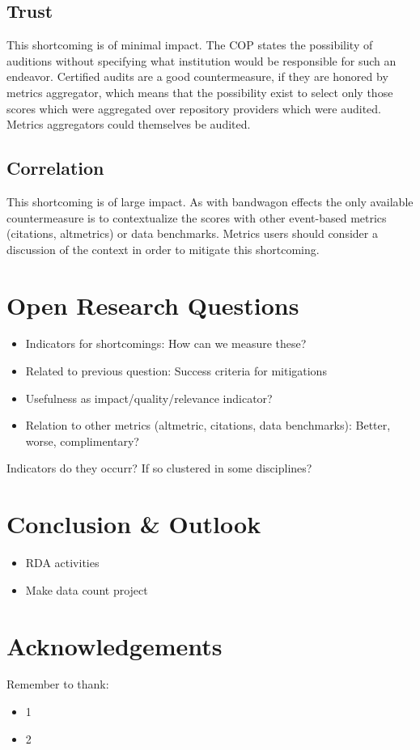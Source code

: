 \documentclass[conference, a4paper]{IEEEtran}\usepackage[]{graphicx}\usepackage[]{color}
\begin{document}
\subsection{Trust}
This shortcoming is of minimal impact.
The COP states the possibility of auditions without specifying what institution would be
responsible for such an endeavor.
Certified audits are a good countermeasure, if they are honored by metrics aggregator,
which means that the possibility exist to select only those scores which were aggregated
over repository providers which were audited.
Metrics aggregators could themselves be audited.

\subsection{Correlation}
This shortcoming is of large impact.
As with bandwagon effects the only available countermeasure is to contextualize the scores
with other event-based metrics (citations, altmetrics) or data benchmarks.
Metrics users should consider a discussion of the context in order to mitigate this shortcoming.

\section{Open Research Questions}\label{sec:questions}


\begin{itemize}
        \item Indicators for shortcomings: How can we measure these?
        \item Related to previous question: Success criteria for mitigations
        \item Usefulness as impact/quality/relevance indicator?
        \item Relation to other metrics (altmetric, citations, data benchmarks):
            Better, worse, complimentary?
\end{itemize}
Indicators do they occurr? If so clustered in some disciplines?
\section{Conclusion \& Outlook}\label{sec:conclusion}
\begin{itemize}
        \item RDA activities
        \item Make data count project
\end{itemize}


\section*{Acknowledgements}
Remember to thank:
\begin{itemize}
    \item 1
    \item 2
\end{itemize}



\end{document}
